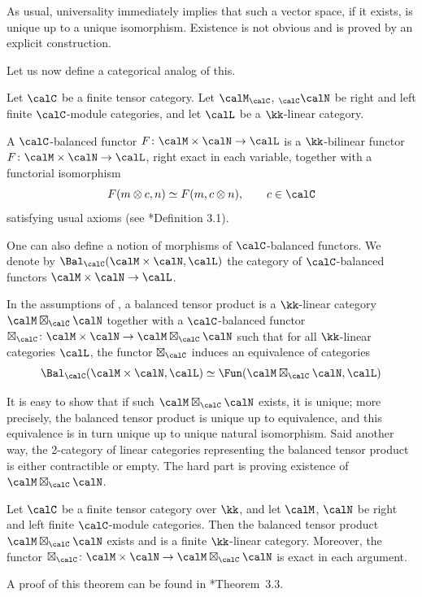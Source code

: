 As usual, universality immediately implies that such a vector space, if it
exists, is unique up to a unique isomorphism. Existence is not obvious and is
proved by an explicit construction.

Let us now define a categorical analog of this.

\begin{definition}\label{d:balanced}
  Let $\calC$ be a finite tensor category. Let
  $\calM_\calC$, ${}_\calC \calN$ be right and left finite $\calC$-module
  categories, and let $\calL$ be a $\kk$-linear category.

  A $\calC$-balanced functor $F\colon \calM\times \calN\to \calL$ is a
  $\kk$-bilinear functor $F\colon \calM\times \calN\to \calL$, right exact in
  each variable, together with a functorial isomorphism
  $$
    F(m\otimes c, n)\simeq F(m, c\otimes n), \qquad c\in \calC
  $$
  satisfying usual axioms (see *{Definition 3.1}).
\end{definition}

One can also define a notion of morphisms of $\calC$-balanced functors. We
denote by $\Bal_\calC(\calM\times \calN, \calL)$ the category of
$\calC$-balanced functors $\calM\times \calN\to \calL$.

\begin{definition}\label{d:deligne-balanced}
  In the assumptions of , a balanced tensor product is a
  $\kk$-linear category $\calM\boxtimes_\calC \calN$ together with a
  $\calC$-balanced functor $\boxtimes_\calC\colon \calM\times \calN\to \calM
  \boxtimes_\calC \calN$ such that for all $\kk$-linear categories
  $\calL$, the functor $\boxtimes_\calC$
  induces an equivalence of categories
  $$
    \Bal_\calC(\calM\times \calN, \calL)\simeq
    \Fun(\calM\boxtimes_\calC \calN, \calL)
  $$
\end{definition}
It is easy to show that if such $\calM\boxtimes_\calC \calN$ exists, it is
unique; more precisely, the balanced tensor product is unique up to equivalence,
and this equivalence is in turn unique up to unique natural isomorphism. Said
another way, the 2-category of linear categories representing the balanced
tensor product is either contractible or empty. The hard part is proving
existence of $\calM\boxtimes_\calC \calN$.

\begin{theorem}\label{t:deligne-balanced}
  Let $\calC$ be a finite tensor category over $\kk$, and let $\calM$, $\calN$
  be right and left finite $\calC$-module categories. Then the balanced tensor
  product $\calM\boxtimes_\calC\calN$ exists and is a finite $\kk$-linear
  category. Moreover, the functor $\boxtimes_\calC\colon \calM\times\calN\to
  \calM\boxtimes_\calC\calN$ is exact in each argument.
\end{theorem}
A proof of this theorem can be found in *{Theorem~3.3}.

